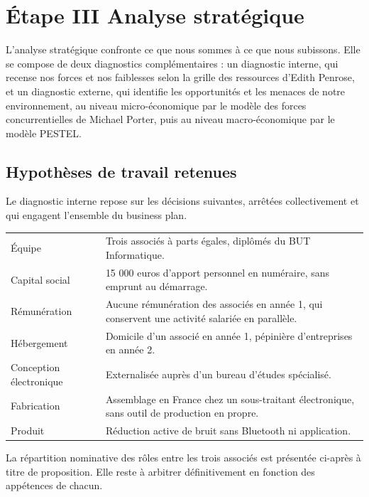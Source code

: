 \clearpage
\section{Étape III \textendash{} Analyse stratégique}

L'analyse stratégique confronte ce que nous sommes à ce que nous subissons. Elle
se compose de deux diagnostics complémentaires : un diagnostic interne, qui
recense nos forces et nos faiblesses selon la grille des ressources d'Edith
Penrose, et un diagnostic externe, qui identifie les opportunités et les menaces
de notre environnement, au niveau micro-économique par le modèle des forces
concurrentielles de Michael Porter, puis au niveau macro-économique par le
modèle PESTEL.

\subsection{Hypothèses de travail retenues}

Le diagnostic interne repose sur les décisions suivantes, arrêtées collectivement
et qui engagent l'ensemble du business plan.

\begin{center}
\begin{tabularx}{\textwidth}{P{4cm}L}
\toprule
{} &  \\
\midrule
Équipe & Trois associés à parts égales, diplômés du BUT Informatique. \\
Capital social & 15 000 euros d'apport personnel en numéraire, sans emprunt au
démarrage. \\
Rémunération & Aucune rémunération des associés en année 1, qui conservent une
activité salariée en parallèle. \\
Hébergement & Domicile d'un associé en année 1, pépinière d'entreprises en
année 2. \\
Conception électronique & Externalisée auprès d'un bureau d'études spécialisé. \\
Fabrication & Assemblage en France chez un sous-traitant électronique, sans
outil de production en propre. \\
Produit & Réduction active de bruit sans Bluetooth ni application. \\
\bottomrule
\end{tabularx}
\end{center}

\begin{hypothese}
La répartition nominative des rôles entre les trois associés est présentée
ci-après à titre de proposition. Elle reste à arbitrer définitivement en
fonction des appétences de chacun.
\end{hypothese}

